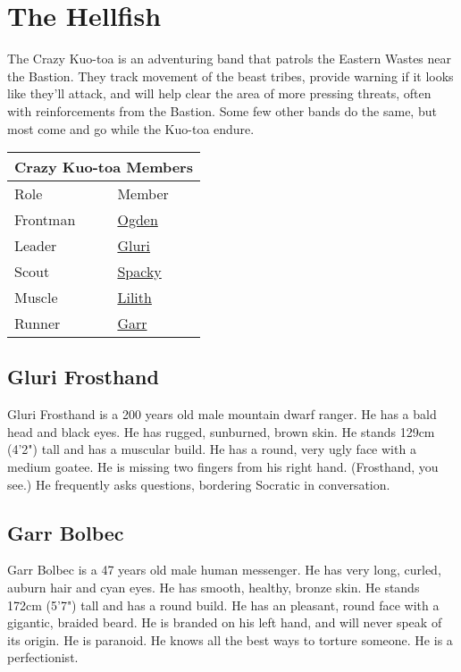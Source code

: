 \section{The Hellfish}

The Crazy Kuo-toa is an adventuring band that patrols the Eastern Wastes near the Bastion.
They track movement of the beast tribes, provide warning if it looks like they'll attack, and will
  help clear the area of more pressing threats, often with reinforcements from the Bastion.
Some few other bands do the same, but most come and go while the Kuo-toa endure.

\bigskip
\begin{center}
\begin{tabular}{|l|l|}
\hline
\multicolumn{2}{|c|}{Crazy Kuo-toa Members}\\
\hline
Role & Member \\
\hline
Frontman & \hyperref[subsec:ogden]{Ogden} \\
Leader & \hyperref[subsec:gluri]{Gluri} \\
Scout & \hyperref[subsec:buddyhawks]{Spacky} \\
Muscle & \hyperref[subsec:alotel]{Lilith} \\
Runner & \hyperref[subsec:garr]{Garr} \\
\hline
\end{tabular}
\end{center}

\subsection{Gluri Frosthand}\label{subsec:gluri}

Gluri Frosthand is a 200 years old male mountain dwarf ranger.
He has a bald head and black eyes.
He has rugged, sunburned, brown skin.
He stands 129cm (4'2") tall and has a muscular build.
He has a round, very ugly face with a medium goatee.
He is missing two fingers from his right hand.
(Frosthand, you see.)
He frequently asks questions, bordering Socratic in conversation.

\subsection{Garr Bolbec}\label{subsec:garr}

Garr Bolbec is a 47 years old male human messenger.
He has very long, curled, auburn hair and cyan eyes.
He has smooth, healthy, bronze skin.
He stands 172cm (5'7") tall and has a round build.
He has an pleasant, round face with a gigantic, braided beard.
He is branded on his left hand, and will never speak of its origin.
He is paranoid.
He knows all the best ways to torture someone.
He is a perfectionist.
